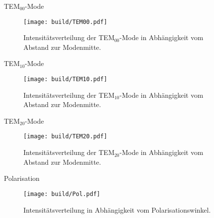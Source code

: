 TEM$_{00}$-Mode

\begin{figure}[H]
  \centering
  \texttt{[image: build/TEM00.pdf]}
  \caption {Intensitätsverteilung der TEM$_{00}$-Mode in Abhängigkeit vom Abstand zur Modenmitte.}
  \label{fig:TEM00}
\end{figure}

TEM$_{10}$-Mode

\begin{figure}[H]
  \centering
  \texttt{[image: build/TEM10.pdf]}
  \caption {Intensitätsverteilung der TEM$_{10}$-Mode in Abhängigkeit vom Abstand zur Modenmitte.}
  \label{fig:TEM10}
\end{figure}

TEM$_{20}$-Mode

\begin{figure}[H]
  \centering
  \texttt{[image: build/TEM20.pdf]}
  \caption {Intensitätsverteilung der TEM$_{20}$-Mode in Abhängigkeit vom Abstand zur Modenmitte.}
  \label{fig:TEM20}
\end{figure}


Polarisation

\begin{figure}[H]
  \centering
  \texttt{[image: build/Pol.pdf]}
  \caption {Intensitätsverteilung in Abhängigkeit vom Polarisationswinkel.}
  \label{fig:Pol}
\end{figure}